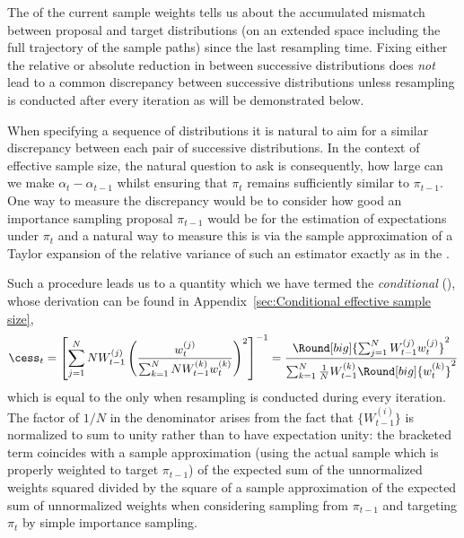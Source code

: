 The \ess of the current sample weights tells us about the accumulated mismatch
between proposal and target distributions (on an extended space including the
full trajectory of the sample paths) since the last resampling time. Fixing
either the relative or absolute reduction in \ess between successive
distributions does \emph{not} lead to a common discrepancy between successive
distributions unless resampling is conducted after every iteration as will be
demonstrated below.

When specifying a sequence of distributions it is natural to aim for a similar
discrepancy between each pair of successive distributions. In the context of
effective sample size, the natural question to ask is consequently, how large
can we make $\alpha_t - \alpha_{t-1}$ whilst ensuring that $\pi_{t}$ remains
sufficiently similar to $\pi_{t-1}$. One way to measure the discrepancy would
be to consider how good an importance sampling proposal $\pi_{t-1}$ would be
for the estimation of expectations under $\pi_t$ and a natural way to measure
this is via the sample approximation of a Taylor expansion of the relative
variance of such an estimator exactly as in the \ess.

Such a procedure leads us to a quantity which we have termed the
\emph{conditional} \ess (\cess), whose derivation can be found in
Appendix~\ref{sec:Conditional effective sample size},
\begin{equation}
  \cess_t = \left[ {\sum_{j=1}^N N W_{t-1}^{(j)} \left(
        \frac{w_t^{(j)}}{\sum_{k=1}^N
          N W_{t-1}^{(k)}w_t^{(k)}}\right)^2} \right]^{-1}
  = \frac{\Round[big]{\sum_{j=1}^NW_{t-1}^{(j)}w_t^{(j)}}^2}
  {\sum_{k=1}^N \frac{1}{N} W_{t-1}^{(k)} \Round[big]{w_t^{(k)}}^2}
\end{equation}
which is equal to the \ess only when resampling is conducted during every
iteration. The factor of $1/N$ in the denominator arises from the fact that
$\{W_{t-1}^{(i)}\}$ is normalized to sum to unity rather than to have expectation
unity: the bracketed term coincides with a sample approximation (using the
actual sample which is properly weighted to target $\pi_{t-1}$) of the
expected sum of the unnormalized weights squared divided by the square of a
sample approximation of the expected sum of unnormalized weights when
considering sampling from $\pi_{t-1}$ and targeting $\pi_t$ by simple
importance sampling.


